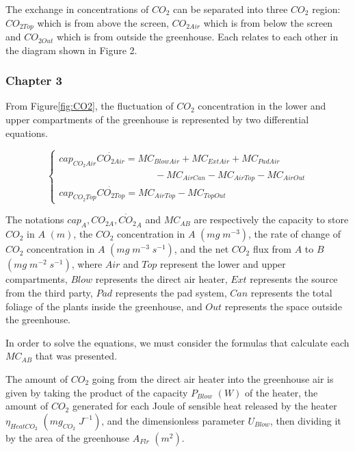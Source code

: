 \documentclass[a4paper]{article}
\begin{document}
The exchange in concentrations of \(CO_2\) can be separated into three \(CO_2\) region: \(CO_{2Top}\) which is from above the screen, \(CO_{2Air}\) which is from below the screen and \(CO_{2Out}\) which is from outside the greenhouse.
Each relates to each other in the diagram shown in Figure 2.

\subsubsection{Chapter 3}
From Figure{}\ref{fig:CO2}, the fluctuation of \(CO_2\) concentration in the lower and upper compartments of the greenhouse is represented by two differential equations.

\begin{equation}
  \begin{cases}
    cap_{CO_2 Air}\dot{CO_{2 Air}} = MC_{BlowAir} + MC_{ExtAir} + MC_{PadAir} \\ \qquad \qquad \qquad \qquad \qquad
    - MC_{AirCan} - MC_{AirTop} - MC_{AirOut}                                 \\
    cap_{CO_2 Top}\dot{CO_{2 Top}} = MC_{AirTop} - MC_{TopOut}
  \end{cases}
\end{equation}


The notations \(cap_A, CO_{2 A}, \dot{CO_2}_A\) and \(MC_{AB}\) are respectively the capacity to store \(CO_2\) in \(A\) \((m)\), the \(CO_2\) concentration in \(A\) \((mg\;m^{-3})\), the rate of change of \(CO_2\) concentration in \(A\) \((mg\;m^{-3}\;s^{-1})\), and the net \(CO_2\) flux from \(A\) to \(B\) \((mg\;m^{-2}\;s^{-1})\), where \(Air\) and \(Top\) represent the lower and upper compartments, \(Blow\) represents the direct air heater, \(Ext\) represents the source from the third party, \(Pad\) represents the pad system, \(Can\) represents the total foliage of the plants inside the greenhouse, and \(Out\) represents the space outside the greenhouse.

In order to solve the equations, we must consider the formulas that calculate each \(MC_{AB}\) that was presented.

The amount of \(CO_2\) going from the direct air heater into the greenhouse air is given by taking the product of the capacity \(P_{Blow}\) \((W)\) of the heater, the amount of \(CO_2\) generated for each Joule of sensible heat released by the heater \(\eta_{HeatCO_2}\) \((mg_{CO_2}\;J^{-1})\), and the dimensionless parameter \(U_{Blow}\), then dividing it by the area of the greenhouse \(A_{Flr}\) \((m^2)\).
\end{document}

